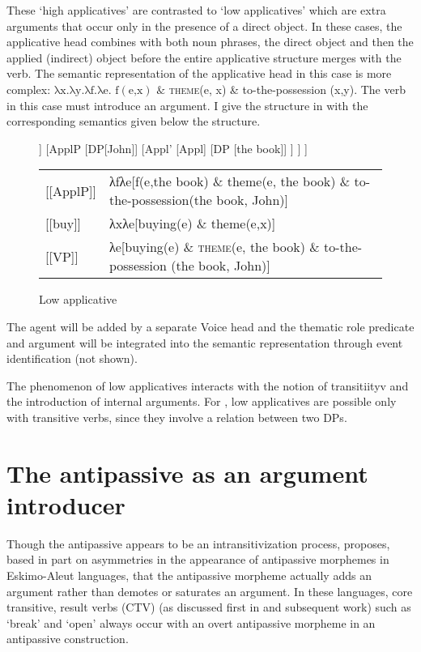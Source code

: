 \documentclass[output=paper,modfonts,nonflat,newtxmath]{langsci/langscibook}
\begin{document}
These ‘high applicatives’ are contrasted to ‘low applicatives’ which are extra arguments that occur only in the presence of a direct object. In these cases, the applicative head combines with both noun phrases, the direct object and then the applied (indirect) object before the entire applicative structure merges with the verb. The semantic representation of the applicative head in this case is more complex:  $\text{λx.λy.λf.λe}\text{. f}\left(\text{e,x}\right)\text{ \&} $  \textsc{theme}(e, x) \& to-the-possession (x,y). The verb in this case must introduce an argument. I give the structure in  with the corresponding semantics given below the structure.


\begin{figure}
	\begin{forest}
		[VP
			[V [buy]] 
			[ApplP 
				[DP[John]]
				[Appl'
					[Appl]
					[DP [the book]]
				]	
			]
		]
	\end{forest}
	
	\begin{tabular}{l p{8cm}}
		{[}{[}ApplP{]}{]}  &  λfλe{[}f(e,the book) \& theme(e, the book) \& to-the-possession(the book, John){]}\\
		{[}{[}buy{]}{]} &  λxλe{[}buying(e) \& theme(e,x){]}\\
		{[}{[}VP{]}{]} &  λe{[}buying(e) \& \textsc{theme}(e, the book) \& to-the-possession (the book, John){]} 
	\end{tabular}
	\caption{\label{fig:basilico:2} Low applicative}
\end{figure}


The agent will be added by a separate Voice head and the thematic role predicate and argument will be integrated into the semantic representation through event identification (not shown).

The phenomenon of low applicatives interacts with the notion of transitiityv and the introduction of internal arguments. For \citet{Pyllkänen2008}, low applicatives are possible only with transitive verbs, since they involve a relation between two DPs.

\section{The antipassive as an argument introducer} %

Though the antipassive appears to be an intransitivization process, \citep{Basilico2012,Basilico2017}  proposes, based in part on asymmetries in the appearance of antipassive morphemes in Eskimo-Aleut languages, that the antipassive morpheme actually adds an argument rather than demotes or saturates an argument. In these languages, core transitive, result verbs (CTV) (as discussed first in \citealt{Levin1999, RappaportHovavLevin1999} and subsequent work) such as ‘break’ and ‘open’ always occur with an overt antipassive morpheme in an antipassive construction. 
\end{document}
